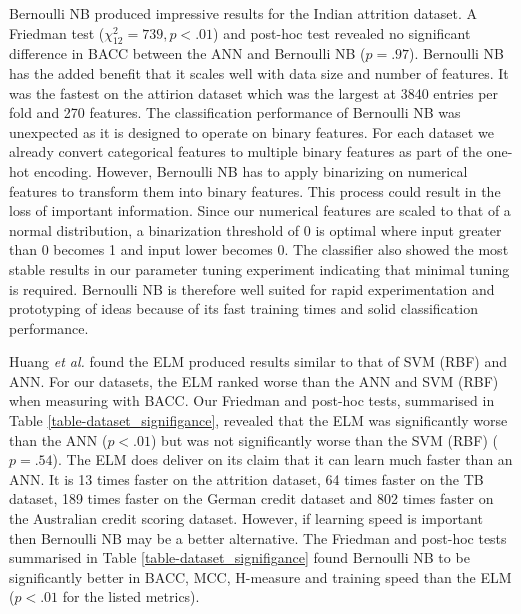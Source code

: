 \documentclass{sig-alternate-05-2015}
\begin{document}
	Bernoulli NB produced impressive results for the Indian attrition dataset. A Friedman test ($\chi^2_{12}=739, p<.01$) and post-hoc test revealed no significant difference in BACC between the ANN and Bernoulli NB ($p=.97$). Bernoulli NB has the added benefit that it scales well with data size and number of features. It was the fastest on the attirion dataset which was the largest at 3840 entries per fold and 270 features. The classification performance of Bernoulli NB was unexpected as it is designed to operate on binary features. For each dataset we already convert categorical features to multiple binary features as part of the one-hot encoding. However, Bernoulli NB has to apply binarizing on numerical features to transform them into binary features. This process could result in the loss of important information. Since our numerical features are scaled to that of a normal distribution, a binarization threshold of 0 is optimal where input greater than 0 becomes 1 and input lower becomes 0. The classifier also showed the most stable results in our parameter tuning experiment indicating that minimal tuning is required. Bernoulli NB is therefore well suited for rapid experimentation and prototyping of ideas because of its fast training times and solid classification performance.

	Huang \textit{et al.} \cite{6035797, Huang2006489} found the ELM produced results similar to that of SVM (RBF) and ANN. For our datasets, the ELM ranked worse than the ANN and SVM (RBF) when measuring with BACC. Our Friedman and post-hoc tests, summarised in Table \ref{table-dataset_signifigance}, revealed that the ELM was significantly worse than the ANN ($p<.01$) but was not significantly worse than the SVM (RBF) ($p=.54$). The ELM does deliver on its claim that it can learn much faster than an ANN. It is 13 times faster on the attrition dataset, 64 times faster on the TB dataset, 189 times faster on the German credit dataset and 802 times faster on the Australian credit scoring dataset. However, if learning speed is important then Bernoulli NB may be a better alternative. The Friedman and post-hoc tests summarised in Table \ref{table-dataset_signifigance} found Bernoulli NB to be significantly better in BACC, MCC, H-measure and training speed than the ELM ($p<.01$ for the listed metrics).
	
\end{document}
